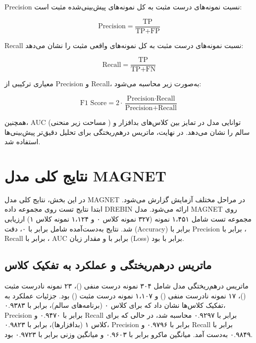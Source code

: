 Precision نسبت نمونه‌های درست مثبت به کل نمونه‌های پیش‌بینی‌شده مثبت است:

\begin{equation}
\text{Precision} = \frac{\text{TP}}{\text{TP} + \text{FP}}
\end{equation}

Recall نسبت نمونه‌های درست مثبت به کل نمونه‌های واقعی مثبت را نشان می‌دهد:

\begin{equation}
\text{Recall} = \frac{\text{TP}}{\text{TP} + \text{FN}}
\end{equation}

 معیاری ترکیبی از Precision و Recall، به‌صورت زیر محاسبه می‌شود:

\begin{equation}
\text{F1 Score} = 2 \cdot \frac{\text{Precision} \cdot \text{Recall}}{\text{Precision} + \text{Recall}}
\end{equation}

همچنین، AUC (مساحت زیر منحنی ) توانایی مدل در تمایز بین کلاس‌های بدافزار و سالم را نشان می‌دهد. در نهایت، ماتریس درهم‌ریختگی  برای تحلیل دقیق‌تر پیش‌بینی‌ها استفاده شد.

\section{نتایج کلی مدل MAGNET}
در این بخش، نتایج کلی مدل MAGNET در مراحل مختلف آزمایش گزارش می‌شود. ابتدا نتایج تست روی مجموعه داده DREBIN \cite{Drebin} ارائه می‌شود. مدل MAGNET روی مجموعه تست شامل ۱،۴۵۱ نمونه (۳۲۷ نمونه کلاس ۰ و ۱،۱۲۴ نمونه کلاس ۱) ارزیابی شد. نتایج به‌دست‌آمده شامل  برابر با ۰، دقت (Accuracy) برابر با  Precision برابر با ، Recall برابر با ، AUC برابر با  و مقدار زیان (Loss) برابر با  بود.

\subsection{ماتریس درهم‌ریختگی و عملکرد به تفکیک کلاس}
ماتریس درهم‌ریختگی مدل شامل ۳۰۴ نمونه درست منفی ()، ۲۳ نمونه نادرست مثبت ()، ۱۷ نمونه نادرست منفی () و ۱،۱۰۷ نمونه درست مثبت () بود. جزئیات عملکرد به تفکیک کلاس‌ها نشان داد که برای کلاس ۰ (برنامه‌های سالم)،  برابر با ۰.۹۳۸۳، Precision برابر با ۰.۹۴۷۰ و Recall برابر با ۰.۹۲۹۷ محاسبه شد، در حالی که برای کلاس ۱ (بدافزارها)،  برابر با ۰.۹۸۲۳، Precision برابر با ۰.۹۷۹۶ و Recall برابر با ۰.۹۸۴۹ به‌دست آمد. میانگین ماکرو  برابر با ۰.۹۶۰۳ و میانگین وزنی  برابر با ۰.۹۷۲۳ بود.

